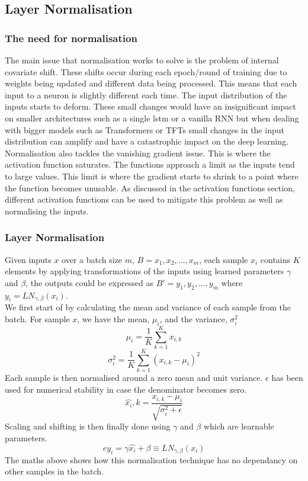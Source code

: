 \documentclass{article}
\begin{document}
\subsection{Layer Normalisation}

\subsubsection{The need for normalisation}
The main issue that normalisation works to solve is the problem of internal
covariate shift. These shifts occur during each epoch/round of training due to weights
being updated and different data being processed. This means that each input to a
neuron is slightly different each time. The input distribution of the inputs starts
to deform.
These small changes would have an insignificant impact on smaller architectures
such as a single lstm or a vanilla RNN but when dealing with bigger models such as Transformers
or TFTs small changes in the input distribution can amplify and have a catastrophic
impact on the deep learning.
Normalisation also tackles the vanishing gradient issue. This is where the activation
function saturates. The functions approach a limit as the inputs tend to large values.
This limit is where the gradient starts to shrink to a point where the function becomes
unusable. As discussed in the activation functions section, different activation functions
can be used to mitigate this problem as well as normalising the inputs.

\subsubsection{Layer Normalisation}


Given inputs $x$ over a batch size $m$, $B = {x_1,x_2, ..., x_m}$, each sample $x_i$ contains $K$ elements by applying transformations of the inputs using learned parameters
$\gamma$ and $\beta$, the outputs could be expressed as $B' = {y_1,y_2,...,y_m}$ where
$y_i=LN_{\gamma,\beta}(x_i)$. \\
We first start of by calculating the mean and variance of each sample from the batch.
For sample $x$, we have the mean, $\mu_i$, and the variance, $\sigma_i^2$
$$\mu_i = \frac{1}{K}\sum^K_{k=1}x_{i,k}$$
$$\sigma_i^2 = \frac{1}{K}\sum^K_{k=1}(x_{i,k}-\mu_i)^2$$
Each sample is then normalised around a zero mean and unit variance. $\epsilon$ has been used for numerical stability in case the denominator becomes zero.
$$\hat{x_i},k= \frac{x_{i,k}-\mu_i}{\sqrt{\sigma_i^2+\epsilon}}$$
Scaling and shifting is then finally done using $\gamma$ and $\beta$ which are learnable parameters.
$$ey_i = \gamma \hat{x_i}+\beta \equiv LN_{\gamma,\beta}(x_i)$$
The maths above shows how this normalisation technique has no dependancy on other samples in the batch.
\end{document}
